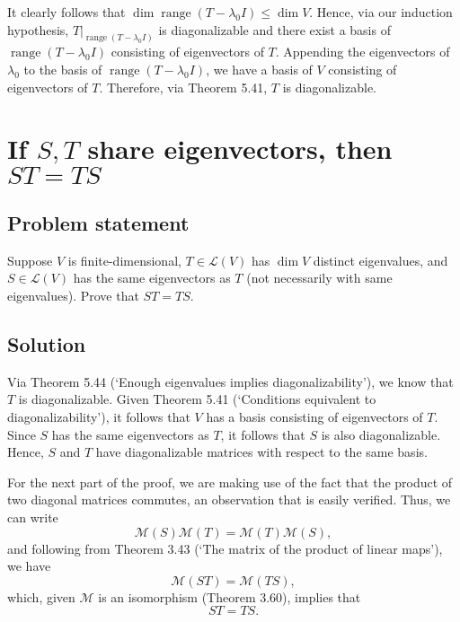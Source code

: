 \documentclass{article}
\begin{document}
It clearly follows that $\dim \operatorname{range}(T-\lambda_0 I)\leq \dim V$. 
Hence, via our induction hypothesis, $T|_{\operatorname{range}(T-\lambda_0 I)}$ is diagonalizable and there exist a basis of\newline $\operatorname{range}(T-\lambda_0 I)$ consisting of eigenvectors of $T$. 
Appending the eigenvectors of $\lambda_0$ to the basis of $\operatorname{range}(T-\lambda_0 I)$, we have a basis of $V$ consisting of eigenvectors of $T$. 
Therefore, via Theorem 5.41, $T$ is diagonalizable.

\clearpage

\section{If $S,T$ share eigenvectors, then $ST=TS$}
\subsection*{Problem statement}
Suppose $V$ is finite-dimensional, $T\in\mathcal{L}(V)$ has $\dim V$ distinct eigenvalues, and $S\in\mathcal{L}(V)$ has the same eigenvectors as $T$ (not necessarily with same eigenvalues).
Prove that $ST=TS$.

\subsection*{Solution}
Via Theorem 5.44 (`Enough eigenvalues implies diagonalizability'), we know that $T$ is diagonalizable. 
Given Theorem 5.41 (`Conditions equivalent to diagonalizability'), it follows that $V$ has a basis consisting of eigenvectors of $T$. 
Since $S$ has the same eigenvectors as $T$, it follows that $S$ is also diagonalizable. 
Hence, $S$ and $T$ have diagonalizable matrices with respect to the same basis.

For the next part of the proof, we are making use of the fact that the product of two diagonal matrices commutes, an observation that is easily verified. 
Thus, we can write
\[\mathcal{M}(S)\mathcal{M}(T)=\mathcal{M}(T)\mathcal{M}(S),\]
and following from Theorem 3.43 (`The matrix of the product of linear maps'), we have
\[\mathcal{M}(ST)=\mathcal{M}(TS),\]
which, given $\mathcal{M}$ is an isomorphism (Theorem 3.60), implies that
\[ST=TS.\]

\clearpage
\end{document}
